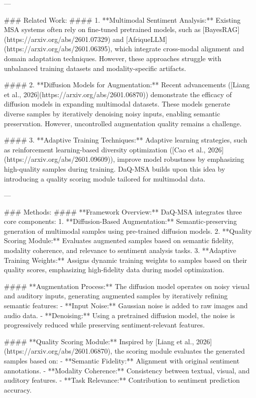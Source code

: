 ---

### Related Work:
#### 1. **Multimodal Sentiment Analysis:**
Existing MSA systems often rely on fine-tuned pretrained models, such as [BayesRAG](https://arxiv.org/abs/2601.07329) and [AfriqueLLM](https://arxiv.org/abs/2601.06395), which integrate cross-modal alignment and domain adaptation techniques. However, these approaches struggle with unbalanced training datasets and modality-specific artifacts.

#### 2. **Diffusion Models for Augmentation:**
Recent advancements ([Liang et al., 2026](https://arxiv.org/abs/2601.06870)) demonstrate the efficacy of diffusion models in expanding multimodal datasets. These models generate diverse samples by iteratively denoising noisy inputs, enabling semantic preservation. However, uncontrolled augmentation quality remains a challenge.

#### 3. **Adaptive Training Techniques:**
Adaptive learning strategies, such as reinforcement learning-based diversity optimization ([Cao et al., 2026](https://arxiv.org/abs/2601.09609)), improve model robustness by emphasizing high-quality samples during training. DaQ-MSA builds upon this idea by introducing a quality scoring module tailored for multimodal data.

---

### Methods:
#### **Framework Overview:**
DaQ-MSA integrates three core components:
1. **Diffusion-Based Augmentation:** Semantic-preserving generation of multimodal samples using pre-trained diffusion models.
2. **Quality Scoring Module:** Evaluates augmented samples based on semantic fidelity, modality coherence, and relevance to sentiment analysis tasks.
3. **Adaptive Training Weights:** Assigns dynamic training weights to samples based on their quality scores, emphasizing high-fidelity data during model optimization.

#### **Augmentation Process:**
The diffusion model operates on noisy visual and auditory inputs, generating augmented samples by iteratively refining semantic features:
- **Input Noise:** Gaussian noise is added to raw images and audio data.
- **Denoising:** Using a pretrained diffusion model, the noise is progressively reduced while preserving sentiment-relevant features.

#### **Quality Scoring Module:**
Inspired by [Liang et al., 2026](https://arxiv.org/abs/2601.06870), the scoring module evaluates the generated samples based on:
- **Semantic Fidelity:** Alignment with original sentiment annotations.
- **Modality Coherence:** Consistency between textual, visual, and auditory features.
- **Task Relevance:** Contribution to sentiment prediction accuracy.

